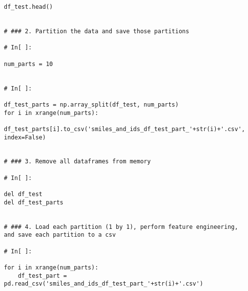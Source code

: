 \documentclass[11pt, oneside]{article}   	%
\begin{document}
\begin{lstlisting}
df_test.head()


# ### 2. Partition the data and save those partitions

# In[ ]:

num_parts = 10


# In[ ]:

df_test_parts = np.array_split(df_test, num_parts)
for i in xrange(num_parts):
    df_test_parts[i].to_csv('smiles_and_ids_df_test_part_'+str(i)+'.csv', index=False)


# ### 3. Remove all dataframes from memory

# In[ ]:

del df_test
del df_test_parts


# ### 4. Load each partition (1 by 1), perform feature engineering, and save each partition to a csv

# In[ ]:

for i in xrange(num_parts):
    df_test_part = pd.read_csv('smiles_and_ids_df_test_part_'+str(i)+'.csv')
  


\end{lstlisting}
\end{document}
